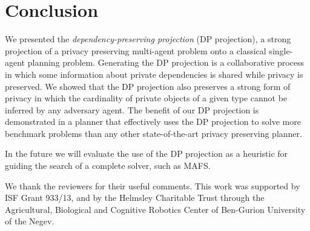 \documentclass[letterpaper]{article}
\theoremstyle{definition}
\begin{document}
\section{Conclusion}
We presented the {\em dependency-preserving projection} (DP projection), a strong projection of a privacy preserving multi-agent problem onto a classical single-agent planning problem. Generating the DP projection is a collaborative process in which some information about private dependencies is shared while privacy is preserved. We showed that the DP projection also preserves a strong form of privacy in which the cardinality of private objects of a given type cannot be inferred by any adversary agent. The benefit of our DP projection is demonstrated in a planner that effectively uses the DP projection to solve more benchmark problems than any other state-of-the-art privacy preserving planner.

In the future we will evaluate the use of the DP projection as a heuristic for guiding the search of a complete solver, such as MAFS.

 We thank the reviewers for their useful comments. This work was supported by ISF Grant 933/13, and by the Helmsley Charitable Trust through the Agricultural, Biological and Cognitive Robotics Center of Ben-Gurion University of the Negev.

\end{document}
